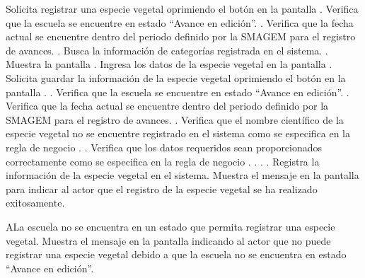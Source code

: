  \begin{UCtrayectoria}
    \UCpaso[\UCactor] Solicita registrar una especie vegetal oprimiendo el botón  en la pantalla .
    \UCpaso[\UCsist] Verifica que la escuela se encuentre en estado ``Avance en edición''. .
    \UCpaso[\UCsist] Verifica que la fecha actual se encuentre dentro del periodo definido por la SMAGEM para el registro de avances. .
    \UCpaso[\UCsist] Busca la información de categorías registrada en el sistema. .
    \UCpaso[\UCsist] Muestra la pantalla .
    \UCpaso[\UCactor] Ingresa los datos de la especie vegetal en la pantalla . \label{cus16:Registrar}
    \UCpaso[\UCactor] Solicita guardar la información de la especie vegetal oprimiendo el botón  en la pantalla . .
    \UCpaso[\UCsist] Verifica que la escuela se encuentre en estado ``Avance en edición''. .
    \UCpaso[\UCsist] Verifica que la fecha actual se encuentre dentro del periodo definido por la SMAGEM para el registro de avances. .
    \UCpaso[\UCsist] Verifica que el nombre científico de la especie vegetal no se encuentre registrado en el sistema como se especifica en la regla de negocio . .
    \UCpaso[\UCsist] Verifica que los datos requeridos sean proporcionados correctamente como se especifica en la regla de negocio . . . .
    \UCpaso[\UCsist] Registra la información de la especie vegetal en el sistema.
    \UCpaso[\UCsist] Muestra el mensaje  en la pantalla  para indicar al actor que el registro de la especie vegetal se ha realizado exitosamente. 
    
 \end{UCtrayectoria}
 
    \begin{UCtrayectoriaA}{A}{La escuela no se encuentra en un estado que permita registrar una especie vegetal.}
    \UCpaso[\UCsist] Muestra el mensaje  en la pantalla  indicando al actor que no puede registrar una especie vegetal debido a que la escuela no se encuentra en estado ``Avance en edición''. 
 \end{UCtrayectoriaA}

